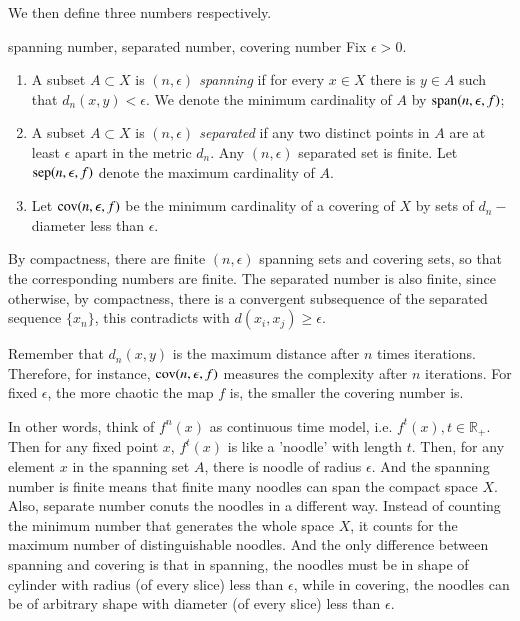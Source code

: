 \documentclass[12pt,a4paper]{article}
\begin{document}
	We then define three numbers respectively.
	\begin{definition}{spanning number, separated number, covering number}{}
		Fix $\epsilon>0$.
		\begin{enumerate}
			\item A subset $A\subset X$ is \emph{$(n,\epsilon)$ spanning} if for every $x\in X$ there is $y\in A$ such that $d_n(x,y)<\epsilon$. We denote the minimum cardinality of $A$ by $\text{span}(n,\epsilon,f)$; 
			\item A subset $A\subset X$ is \emph{$(n,\epsilon)$ separated} if any two distinct points in $A$ are at least $\epsilon$ apart in the metric $d_n$. Any $(n,\epsilon)$ separated set is finite. Let $\text{sep}(n,\epsilon,f)$ denote the maximum cardinality of $A$.
			\item Let $\text{cov}(n,\epsilon,f)$ be the minimum cardinality of a covering of $X$ by sets of $d_n-$ diameter less than $\epsilon$.
		\end{enumerate}
	\end{definition}
	 By compactness, there are finite $(n,\epsilon)$ spanning sets and covering sets, so that the corresponding numbers are finite. The separated number is also finite, since otherwise, by compactness, there is a convergent subsequence of the separated sequence $\{x_n\}$, this contradicts with $d(x_i,x_j)\geq \epsilon$. 
	 
	 Remember that $d_n(x,y)$ is the maximum distance after $n$ times iterations. Therefore, for instance, $\text{cov}(n,\epsilon,f)$ measures the complexity after $n$ iterations. For fixed $\epsilon$, the more chaotic the map $f$ is, the smaller the covering number is. 
	 
	 In other words, think of $f^n(x)$ as continuous time model, i.e. $f^t(x),t\in \mathbb{R}_+$. Then for any fixed point $x$, $f^t(x)$ is like a 'noodle' with length $t$. Then, for any element $x$ in the spanning set $A$, there is noodle of radius $\epsilon$. And the spanning number is finite means that finite many noodles can span the compact space $X$. Also, separate number conuts the noodles in a different way. Instead of counting the minimum number that generates the whole space $X$, it counts for the maximum number of distinguishable noodles. And the only difference between spanning and covering is that in spanning, the noodles must be in shape of cylinder with radius (of every slice) less than $\epsilon$, while in covering, the noodles can be of arbitrary shape with diameter (of every slice) less than $\epsilon$.
	 
\end{document}
